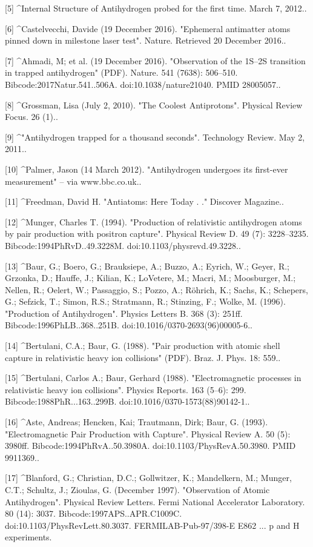 [5]
^Internal Structure of Antihydrogen probed for the first time. March 7, 2012..

[6]
^Castelvecchi, Davide (19 December 2016). "Ephemeral antimatter atoms pinned down in milestone laser test". Nature. Retrieved 20 December 2016..

[7]
^Ahmadi, M; et al. (19 December 2016). "Observation of the 1S–2S transition in trapped antihydrogen" (PDF). Nature. 541 (7638): 506–510. Bibcode:2017Natur.541..506A. doi:10.1038/nature21040. PMID 28005057..

[8]
^Grossman, Lisa (July 2, 2010). "The Coolest Antiprotons". Physical Review Focus. 26 (1)..

[9]
^"Antihydrogen trapped for a thousand seconds". Technology Review. May 2, 2011..

[10]
^Palmer, Jason (14 March 2012). "Antihydrogen undergoes its first-ever measurement" – via www.bbc.co.uk..

[11]
^Freedman, David H. "Antiatoms: Here Today . ." Discover Magazine..

[12]
^Munger, Charles T. (1994). "Production of relativistic antihydrogen atoms by pair production with positron capture". Physical Review D. 49 (7): 3228–3235. Bibcode:1994PhRvD..49.3228M. doi:10.1103/physrevd.49.3228..

[13]
^Baur, G.; Boero, G.; Brauksiepe, A.; Buzzo, A.; Eyrich, W.; Geyer, R.; Grzonka, D.; Hauffe, J.; Kilian, K.; LoVetere, M.; Macri, M.; Moosburger, M.; Nellen, R.; Oelert, W.; Passaggio, S.; Pozzo, A.; Röhrich, K.; Sachs, K.; Schepers, G.; Sefzick, T.; Simon, R.S.; Stratmann, R.; Stinzing, F.; Wolke, M. (1996). "Production of Antihydrogen". Physics Letters B. 368 (3): 251ff. Bibcode:1996PhLB..368..251B. doi:10.1016/0370-2693(96)00005-6..

[14]
^Bertulani, C.A.; Baur, G. (1988). "Pair production with atomic shell capture in relativistic heavy ion collisions" (PDF). Braz. J. Phys. 18: 559..

[15]
^Bertulani, Carlos A.; Baur, Gerhard (1988). "Electromagnetic processes in relativistic heavy ion collisions". Physics Reports. 163 (5–6): 299. Bibcode:1988PhR...163..299B. doi:10.1016/0370-1573(88)90142-1..

[16]
^Aste, Andreas; Hencken, Kai; Trautmann, Dirk; Baur, G. (1993). "Electromagnetic Pair Production with Capture". Physical Review A. 50 (5): 3980ff. Bibcode:1994PhRvA..50.3980A. doi:10.1103/PhysRevA.50.3980. PMID 9911369..

[17]
^Blanford, G.; Christian, D.C.; Gollwitzer, K.; Mandelkern, M.; Munger, C.T.; Schultz, J.; Zioulas, G. (December 1997). "Observation of Atomic Antihydrogen". Physical Review Letters. Fermi National Accelerator Laboratory. 80 (14): 3037. Bibcode:1997APS..APR.C1009C. doi:10.1103/PhysRevLett.80.3037. FERMILAB-Pub-97/398-E E862 ... p and H experiments.

